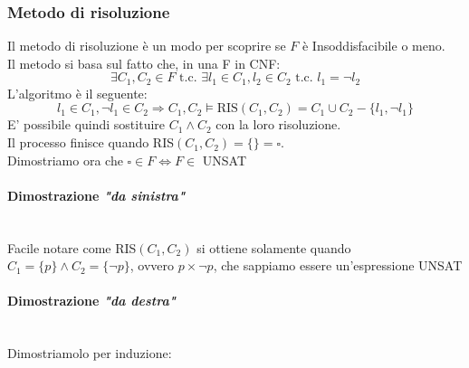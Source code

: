 \documentclass{report}
\newcommand{\subsubsubsection}[1]{\paragraph{#1}\mbox{}\\}
\begin{document}
        \subsubsection{Metodo di risoluzione}
            Il metodo di risoluzione è un modo per scoprire se $F$ è Insoddisfacibile o meno. \\
            Il metodo si basa sul fatto che, in una F in CNF:
            $$\exists C_1, C_2 \in F \textrm{ t.c. } \exists l_1 \in C_1, l_2 \in C_2 \textrm{ t.c. } l_1 = \neg l_2$$
            L'algoritmo è il seguente:
            $$l_1 \in C_1, \neg l_1 \in C_2 \Longrightarrow C_1, C_2 \models \textrm{RIS}\left(C_1, C_2\right) = C_1 \cup C_2 - \{l_1, \neg l_1\}$$
            E' possibile quindi sostituire $C_1 \land C_2$ con la loro risoluzione. \\
            Il processo finisce quando RIS$\left(C_1, C_2\right) = \{\} = \square$. \\
            Dimostriamo ora che $\square \in F \iff F \in$ UNSAT
            \subsubsubsection{Dimostrazione \textit{"da sinistra"}}
                Facile notare come RIS$\left(C_1, C_2\right)$ si ottiene solamente quando $C_1 = \{p\} \land C_2 = \{\neg p\}$, 
                ovvero $p \times \neg p$, che sappiamo essere un'espressione UNSAT
            \subsubsubsection{Dimostrazione \textit{"da destra"}}
                Dimostriamolo per induzione:
\end{document}
